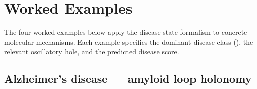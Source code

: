\section{Worked Examples}
\label{sec:ch07-worked-examples}

The four worked examples below apply the disease state formalism to concrete
molecular mechanisms.  Each example specifies the dominant disease class
(), the relevant oscillatory hole, and the predicted
disease score.

\subsection{Alzheimer's disease — amyloid loop holonomy}
\label{sec:ch07-eg-alzheimer}

